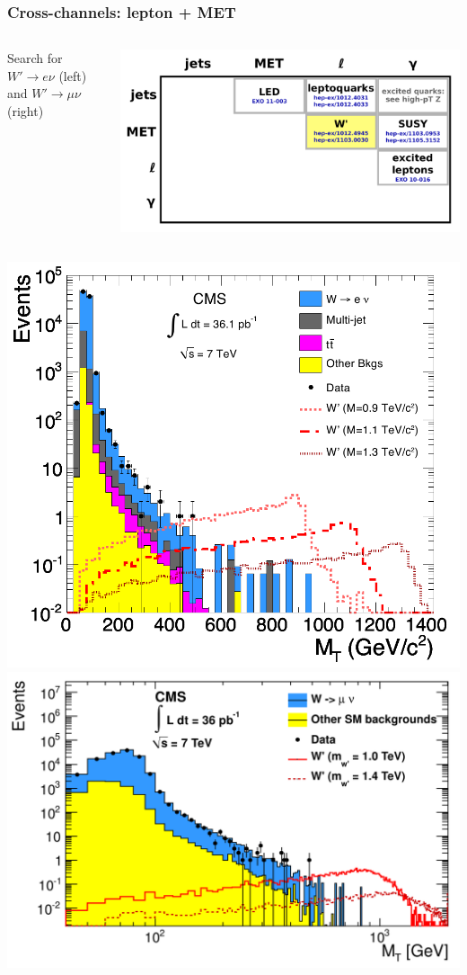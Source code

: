 \documentclass[compress]{beamer}
\begin{document}
\begin{frame}
\frametitle{Cross-channels: lepton + MET}

\begin{columns}
Search for $W' \to e\nu$ (left) and $W' \to \mu\nu$ (right) 

\includegraphics[width=\linewidth]{cross-channels_wprime.pdf}
\end{columns}

\vspace{1 cm}
\includegraphics[height=4 cm]{plots/electron_plus_met_mt.png}
\includegraphics[height=4 cm]{plots/muon_plus_met_mt.png}
\end{frame}
\end{document}

